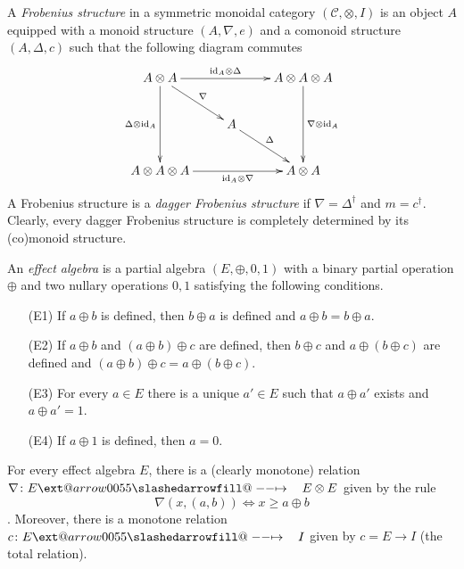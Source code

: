 \documentclass{beamer}
\makeatletter
\newcommand{\id}{\mathrm{id}}
\newcommand{\C}{\mathcal{C}}
\def\slashedarrowfill@#1#2#3#4#5{%
  $\m@th\thickmuskip0mu\medmuskip\thickmuskip\thinmuskip\thickmuskip
  \relax#5#1\mkern-7mu%
  \cleaders\hbox{$#5\mkern-2mu#2\mkern-2mu$}\hfill
  \mathclap{#3}\mathclap{#2}%
  \cleaders\hbox{$#5\mkern-2mu#2\mkern-2mu$}\hfill
  \mkern-7mu#4$%
}
\def\rightslashedarrowfill@{%
  \slashedarrowfill@\relbar\relbar\mapstochar\rightarrow}
\newcommand\xslashedrightarrow[2][]{%
  \ext@arrow 0055{\rightslashedarrowfill@}{#1}{#2}}
\newcommand{\sto}{\xslashedrightarrow{\hskip 1pc}}
\makeatother
\begin{document}
\begin{frame}
A {\em Frobenius structure} in a symmetric monoidal category $(\C,\otimes,I)$ is an object
$A$ equipped with a monoid structure $(A,\nabla,e)$ and a comonoid structure
$(A,\Delta,c)$ such that the following diagram commutes
\begin{equation}
\label{diag:frobenius}
\xymatrix{
A\otimes A
	\ar[rr]^-{\id_A\otimes\Delta}
	\ar[rd]^-{\nabla}
	\ar[dd]_-{\Delta\otimes\id_A}
&
~
&
A\otimes A\otimes A
	\ar[dd]^-{\nabla\otimes\id_A}
\\
~
&
A
	\ar[rd]^-{\Delta}
\\
A\otimes A\otimes A
	\ar[rr]_-{\id_A\otimes\nabla}
&
~
&
A\otimes A
}
\end{equation}
A Frobenius structure is a {\em dagger Frobenius structure} if
$\nabla=\Delta^\dag$ and $m=c^\dag$. Clearly, every dagger Frobenius structure
is completely determined by its (co)monoid structure.
\end{frame}

\begin{frame}
An {\em effect algebra} 
is a partial algebra $(E,\oplus,0,1)$ with a binary 
partial operation $\oplus$ and two nullary operations $0,1$ satisfying
the following conditions.
\begin{enumerate}
\item[(E1)]If $a\oplus b$ is defined, then $b\oplus a$ is defined and
		$a\oplus b=b\oplus a$.
\item[(E2)]If $a\oplus b$ and $(a\oplus b)\oplus c$ are defined, then
		$b\oplus c$ and $a\oplus(b\oplus c)$ are defined and
		$(a\oplus b)\oplus c=a\oplus(b\oplus c)$.
\item[(E3)]For every $a\in E$ there is a unique $a'\in E$ such that
		$a\oplus a'$ exists and $a\oplus a'=1$.
\item[(E4)]If $a\oplus 1$ is defined, then $a=0$.
\end{enumerate}
\end{frame}

\begin{frame}
For every effect algebra $E$, there is a (clearly monotone) relation
$\nabla\colon E\sto E\otimes E$ given by the rule
$$
\nabla(x,(a,b))\Leftrightarrow x\geq a\oplus b
$$. Moreover, there is a monotone relation $c\colon E\sto I$ given by 
$c=E\to I$ (the total relation).
\end{frame}
\end{document}
